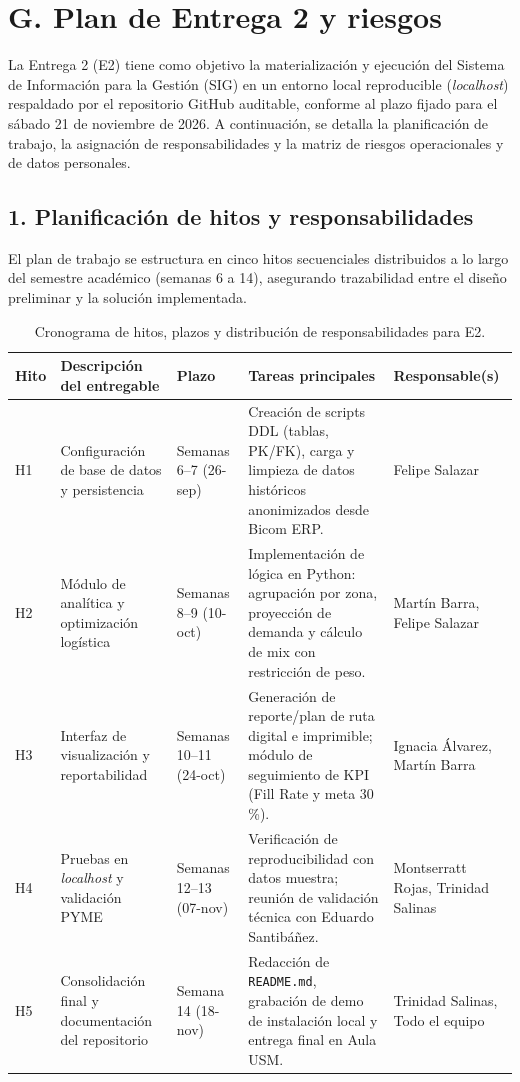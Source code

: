 \documentclass[10pt,a4paper]{article}
\begin{document}
\section*{G. Plan de Entrega 2 y riesgos}

La Entrega 2 (E2) tiene como objetivo la materialización y ejecución del Sistema de Información para la Gestión (SIG) en un entorno local reproducible (\textit{localhost}) respaldado por el repositorio GitHub auditable, conforme al plazo fijado para el sábado 21 de noviembre de 2026. A continuación, se detalla la planificación de trabajo, la asignación de responsabilidades y la matriz de riesgos operacionales y de datos personales.

\subsection*{1. Planificación de hitos y responsabilidades}

El plan de trabajo se estructura en cinco hitos secuenciales distribuidos a lo largo del semestre académico (semanas 6 a 14), asegurando trazabilidad entre el diseño preliminar y la solución implementada.

\begin{table}[H]
\centering
\small
\begin{tabular}{p{1.2cm} p{4.6cm} p{2.2cm} p{4.2cm} p{2.2cm}}
\toprule
\textbf{Hito} & \textbf{Descripción del entregable} & \textbf{Plazo} & \textbf{Tareas principales} & \textbf{Responsable(s)} \\
\midrule
H1 & Configuración de base de datos y persistencia & Semanas 6--7 (26-sep) & Creación de scripts DDL (tablas, PK/FK), carga y limpieza de datos históricos anonimizados desde Bicom ERP. & Felipe Salazar \\
\midrule
H2 & Módulo de analítica y optimización logística & Semanas 8--9 (10-oct) & Implementación de lógica en Python: agrupación por zona, proyección de demanda y cálculo de mix con restricción de peso. & Martín Barra, Felipe Salazar \\
\midrule
H3 & Interfaz de visualización y reportabilidad & Semanas 10--11 (24-oct) & Generación de reporte/plan de ruta digital e imprimible; módulo de seguimiento de KPI (Fill Rate y meta 30\,\%). & Ignacia Álvarez, Martín Barra \\
\midrule
H4 & Pruebas en \textit{localhost} y validación PYME & Semanas 12--13 (07-nov) & Verificación de reproducibilidad con datos muestra; reunión de validación técnica con Eduardo Santibáñez. & Montserratt Rojas, Trinidad Salinas \\
\midrule
H5 & Consolidación final y documentación del repositorio & Semana 14 (18-nov) & Redacción de \texttt{README.md}, grabación de demo de instalación local y entrega final en Aula USM. & Trinidad Salinas, Todo el equipo \\
\bottomrule
\end{tabular}
\caption{Cronograma de hitos, plazos y distribución de responsabilidades para E2.}
\label{tab:hitos-e2}
\end{table}
\end{document}
